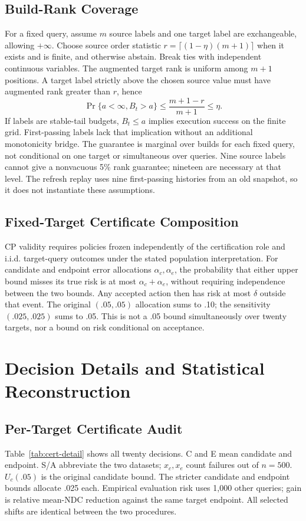 \documentclass[sigconf,anonymous]{acmart}
\begin{document}
\subsection{Build-Rank Coverage}
For a fixed query, assume $m$ source labels and one target label are exchangeable, allowing $+\infty$. Choose source order statistic $r=\lceil(1-\eta)(m+1)\rceil$ when it exists and is finite, and otherwise abstain. Break ties with independent continuous variables. The augmented target rank is uniform among $m+1$ positions. A target label strictly above the chosen source value must have augmented rank greater than $r$, hence
\[
 \Pr\{a<\infty,B_t>a\}\le\frac{m+1-r}{m+1}\le\eta.
\]
If labels are stable-tail budgets, $B_t\le a$ implies execution success on the finite grid. First-passing labels lack that implication without an additional monotonicity bridge. The guarantee is marginal over builds for each fixed query, not conditional on one target or simultaneous over queries. Nine source labels cannot give a nonvacuous 5\% rank guarantee; nineteen are necessary at that level. The refresh replay uses nine first-passing histories from an old snapshot, so it does not instantiate these assumptions.

\subsection{Fixed-Target Certificate Composition}
CP validity requires policies frozen independently of the certification role and i.i.d. target-query outcomes under the stated population interpretation. For candidate and endpoint error allocations $\alpha_c,\alpha_e$, the probability that either upper bound misses its true risk is at most $\alpha_c+\alpha_e$, without requiring independence between the two bounds. Any accepted action then has risk at most $\delta$ outside that event. The original $(.05,.05)$ allocation sums to .10; the sensitivity $(.025,.025)$ sums to .05. This is not a .05 bound simultaneously over twenty targets, nor a bound on risk conditional on acceptance.

\section{Decision Details and Statistical Reconstruction}
\subsection{Per-Target Certificate Audit}
Table~\ref{tab:cert-detail} shows all twenty decisions. C and E mean candidate and endpoint. S/A abbreviate the two datasets; $x_c,x_e$ count failures out of $n=500$. $U_c(.05)$ is the original candidate bound. The stricter candidate and endpoint bounds allocate .025 each. Empirical evaluation risk uses 1,000 other queries; gain is relative mean-NDC reduction against the same target endpoint. All selected shifts are identical between the two procedures.
\end{document}
